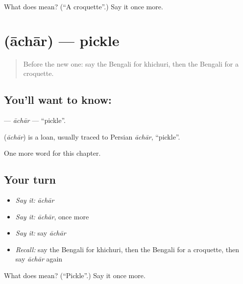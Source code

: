 \begin{tcolorbox}[breakable,colback=teal!4,colframe=teal!35!black,title={Before you move on}]
What does  mean? (\textquotedblleft{}A croquette\textquotedblright{}.) Say it once more.
\end{tcolorbox}
\section[\texorpdfstring{\bn{আচার} (āchār)}{আচার (āchār)}]{ (āchār) — pickle}

\label{lesson:BN-C196-achar}



\begin{quote}
Before the new one: say the Bengali for khichuri, then the Bengali for a croquette.
\end{quote}

\subsection*{You'll want to know: }
\textbf{} — \emph{āchār} — \textquotedblleft{}pickle\textquotedblright{}.

\begin{cousinweb}
\textbf{} (\emph{āchār}) is a loan, usually traced to Persian \emph{āchār}, \textquotedblleft{}pickle\textquotedblright{}.
\end{cousinweb}

\begin{grammarlens}[title={What you've built}]
One more word for this chapter.
\end{grammarlens}

\subsection*{Your turn}
\begin{itemize}
\raggedright
  \item \emph{Say it:} \emph{āchār}
  \item \emph{Say it:} \emph{āchār}, once more
  \item \emph{Say it:} say \emph{āchār}
  \item \emph{Recall:} say the Bengali for khichuri, then the Bengali for a croquette, then say \emph{āchār} again
\end{itemize}

\begin{tcolorbox}[breakable,colback=teal!4,colframe=teal!35!black,title={Before you move on}]
What does  mean? (\textquotedblleft{}Pickle\textquotedblright{}.) Say it once more.
\end{tcolorbox}
